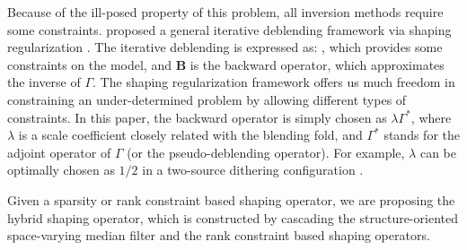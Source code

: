 
Because of the ill-posed property of this problem, all inversion methods require some constraints. \cite{yangkang20142} proposed a general iterative deblending framework via shaping regularization \cite{fomel2007shape}. The iterative deblending is expressed as:
, which provides some constraints on the model, and $\mathbf{B}$ is the backward operator, which approximates the inverse of $\Gamma$. The shaping regularization framework offers us much freedom in constraining an under-determined problem by allowing different types of constraints.  In this paper, the backward operator is simply chosen as $\lambda\Gamma^*$, where $\lambda$ is a scale coefficient closely related with the blending fold, and $\Gamma^*$ stands for the adjoint operator of $\Gamma$ (or the pseudo-deblending operator). For example, $\lambda$ can be optimally chosen as $1/2$ in a two-source dithering configuration \cite[]{yangkang20142,arazthesis2012}. %

Given a sparsity or rank constraint based shaping operator, we are proposing the hybrid shaping operator, which is constructed by cascading the  structure-oriented space-varying median filter and the rank constraint based shaping operators.  

